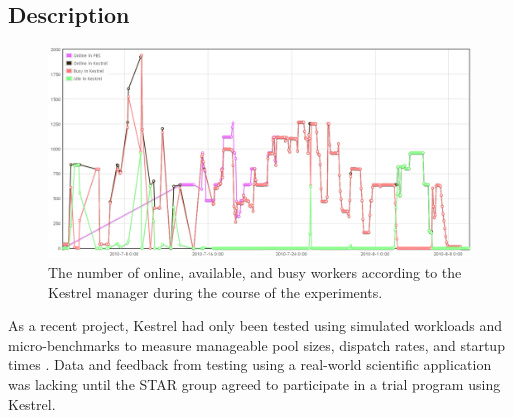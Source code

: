 \subsection{Description}

%
\begin{figure}
\includegraphics[width=\columnwidth]{figures/kestrel_stats}
\caption{\label{fig:Kestrel-Stats} The number of online, available, and busy
workers according to the Kestrel manager during the course of the
experiments. }
\end{figure}


As a recent project, Kestrel had only been tested using simulated
workloads and micro-benchmarks to measure manageable pool sizes, dispatch
rates, and startup times \cite{Stout10}. Data and feedback from testing
using a real-world scientific application was lacking until the STAR
group agreed to participate in a trial program using Kestrel.

